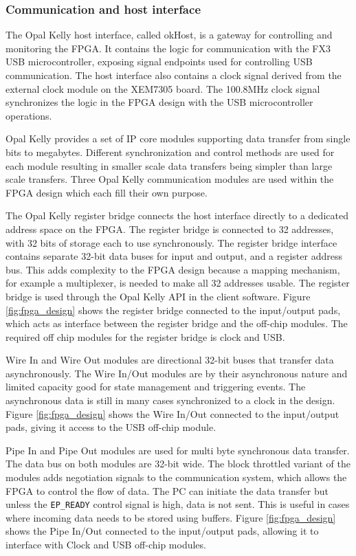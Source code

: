 \documentclass[12pt]{report}
\begin{document}
\subsubsection{Communication and host interface}
The Opal Kelly host interface, called okHost, is a gateway for controlling and monitoring the FPGA. It contains the logic for communication with the FX3 USB microcontroller, exposing signal endpoints used for controlling USB communication. The host interface also contains a clock signal derived from the external clock module on the XEM7305 board. The 100.8MHz clock signal synchronizes the logic in the FPGA design with the USB microcontroller operations.
\par
Opal Kelly provides a set of IP core modules supporting data transfer from single bits to megabytes. Different synchronization and control methods are used for each module resulting in smaller scale data transfers being simpler than large scale transfers. Three Opal Kelly communication modules are used within the FPGA design which each fill their own purpose.
\par
The Opal Kelly register bridge connects the host interface directly to a dedicated address space on the FPGA. The register bridge is connected to 32 addresses, with 32 bits of storage each to use synchronously. The register bridge interface contains separate 32-bit data buses for input and output, and a register address bus. This adds complexity to the FPGA design because a mapping mechanism, for example a multiplexer, is needed to make all 32 addresses usable. The register bridge is used through the Opal Kelly API in the client software. Figure \ref*{fig:fpga_design} shows the register bridge connected to the input/output pads, which acts as interface between the register bridge and the off-chip modules. The required off chip modules for the register bridge is clock and USB.
\par
Wire In and Wire Out modules are directional 32-bit buses that transfer data asynchronously. The Wire In/Out modules are by their asynchronous nature and limited capacity good for state management and triggering events. The asynchronous data is still in many cases synchronized to a clock in the design. Figure \ref*{fig:fpga_design} shows the Wire In/Out connected to the input/output pads, giving it access to the USB off-chip module.
\par
Pipe In and Pipe Out modules are used for multi byte synchronous data transfer. The data bus on both modules are 32-bit wide. The block throttled variant of the modules adds negotiation signals to the communication system, which allows the FPGA to control the flow of data. The PC can initiate the data transfer but unless the \verb|EP_READY| control signal is high, data is not sent. This is useful in cases where incoming data needs to be stored using buffers. Figure \ref*{fig:fpga_design} shows the Pipe In/Out connected to the input/output pads, allowing it to interface with Clock and USB off-chip modules.
\end{document}
